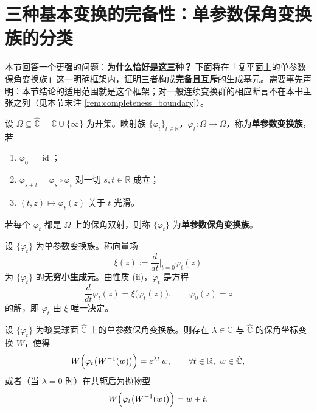 \section{三种基本变换的完备性：单参数保角变换族的分类}
\label{sec:completeness_three_transformations}

本节回答一个更强的问题：\textbf{为什么恰好是这三种？} 下面将在「复平面上的单参数保角变换族」这一明确框架内，证明三者构成\textbf{完备且互斥}的生成基元。需要事先声明：本节结论的适用范围就是这个框架；对一般连续变换群的相应断言不在本书主张之列（见本节末注 \ref{rem:completeness_boundary}）。

\begin{definition}[单参数变换族]\label{def:one_parameter_family}
设 $\Omega\subseteq\hat{\mathbb C}=\mathbb C\cup\{\infty\}$ 为开集。映射族 $\{\varphi_t\}_{t\in\mathbb R}$，$\varphi_t:\Omega\to\Omega$，称为\textbf{单参数变换族}，若
\begin{enumerate}[label=(\roman*)]
    \item $\varphi_0=\operatorname{id}$；
    \item $\varphi_{s+t}=\varphi_s\circ\varphi_t$ 对一切 $s,t\in\mathbb R$ 成立；
    \item $(t,z)\mapsto\varphi_t(z)$ 关于 $t$ 光滑。
\end{enumerate}
若每个 $\varphi_t$ 都是 $\Omega$ 上的保角双射，则称 $\{\varphi_t\}$ 为\textbf{单参数保角变换族}。
\end{definition}

\begin{definition}[无穷小生成元]\label{def:infinitesimal_generator}
设 $\{\varphi_t\}$ 为单参数变换族。称向量场
\[
\xi(z):=\frac{d}{dt}\Big|_{t=0}\varphi_t(z)
\]
为 $\{\varphi_t\}$ 的\textbf{无穷小生成元}。由性质 (ii)，$\varphi_t$ 是方程
\[
\frac{d}{dt}\varphi_t(z)=\xi\bigl(\varphi_t(z)\bigr),\qquad \varphi_0(z)=z
\]
的解，即 $\varphi_t$ 由 $\xi$ 唯一决定。
\end{definition}

\begin{theorem}[单参数保角族的典范形式]\label{thm:canonical_form}
设 $\{\varphi_t\}$ 为黎曼球面 $\hat{\mathbb C}$ 上的单参数保角变换族。则存在 $\lambda\in\mathbb C$ 与 $\hat{\mathbb C}$ 的保角坐标变换 $W$，使得
\[
W\Bigl(\varphi_t\bigl(W^{-1}(w)\bigr)\Bigr)=e^{\lambda t}\,w,\qquad \forall t\in\mathbb R,\ w\in\hat{\mathbb C},
\]
或者（当 $\lambda=0$ 时）在共轭后为抛物型
\[
W\Bigl(\varphi_t\bigl(W^{-1}(w)\bigr)\Bigr)=w+t .
\]
\end{theorem}

